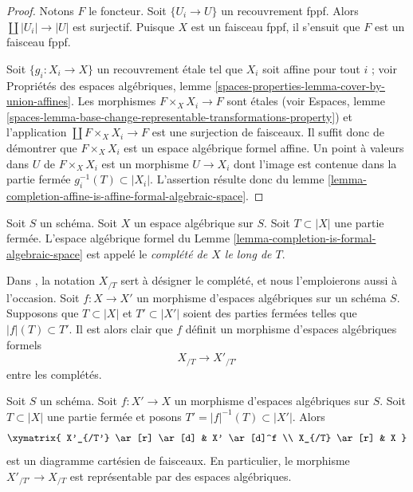 \begin{proof}
Notons $F$ le foncteur. Soit $\{U_i \to U\}$ un recouvrement fppf.
Alors $\coprod |U_i| \to |U|$ est surjectif. Puisque $X$ est un
faisceau fppf, il s'ensuit que $F$ est un faisceau fppf.

\medskip\noindent
Soit $\{g_i : X_i \to X\}$ un recouvrement étale tel que $X_i$ soit affine
pour tout $i$ ; voir Propriétés des espaces algébriques, lemme
\ref{spaces-properties-lemma-cover-by-union-affines}.
Les morphismes $F \times_X X_i \to F$ sont étales
(voir Espaces, lemme
\ref{spaces-lemma-base-change-representable-transformations-property})
et l'application $\coprod F \times_X X_i \to F$ est une surjection de faisceaux.
Il suffit donc de démontrer que $F \times_X X_i$ est un espace algébrique
formel affine. Un point à valeurs dans $U$ de $F \times_X X_i$ est un
morphisme $U \to X_i$ dont l'image est contenue dans la partie fermée
$g_i^{-1}(T) \subset |X_i|$. L'assertion résulte donc du
lemme \ref{lemma-completion-affine-is-affine-formal-algebraic-space}.
\end{proof}

\begin{definition}
\label{definition-completion}
Soit $S$ un schéma. Soit $X$ un espace algébrique sur $S$.
Soit $T \subset |X|$ une partie fermée. L'espace algébrique formel
du Lemme \ref{lemma-completion-is-formal-algebraic-space}
est appelé le {\it complété de $X$ le long de $T$}.
\end{definition}

\noindent
Dans \cite[chapitre I, section 10.8]{EGA}, la notation $X_{/T}$
sert à désigner le complété, et nous l'emploierons aussi
à l'occasion. Soit $f : X \to X'$ un
morphisme d'espaces algébriques sur un schéma $S$. Supposons
que $T \subset |X|$ et $T' \subset |X'|$ soient des parties fermées
telles que $|f|(T) \subset T'$. Il est alors clair que
$f$ définit un morphisme d'espaces algébriques formels
$$
X_{/T} \longrightarrow X'_{/T'}
$$
entre les complétés.

\begin{lemma}
\label{lemma-map-completions-representable}
Soit $S$ un schéma. Soit $f : X' \to X$ un morphisme
d'espaces algébriques sur $S$. Soit $T \subset |X|$
une partie fermée et posons $T' = |f|^{-1}(T) \subset |X'|$.
Alors
$$
\xymatrix{
X'_{/T'} \ar[r] \ar[d] & X' \ar[d]^f \\
X_{/T} \ar[r] & X
}
$$
est un diagramme cartésien de faisceaux. En particulier, le morphisme
$X'_{/T'} \to X_{/T}$ est représentable par des espaces algébriques.
\end{lemma}

